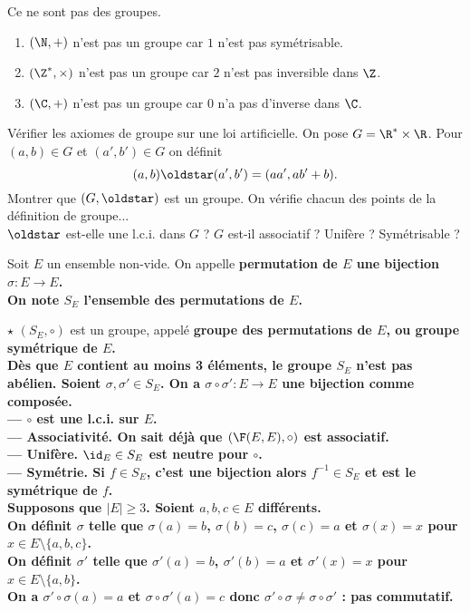 \documentclass[11pt]{article}
\begin{document}
\begin{ex}{Ce ne sont pas des groupes.}{}
    \begin{enumerate}
        \item $(\N,+)$ n'est pas un groupe car $1$ n'est pas symétrisable.
        \item $(\Z^*,\times)$ n'est pas un groupe car $2$ n'est pas inversible dans $\Z$.
        \item $(\C,+)$ n'est pas un groupe car $0$ n'a pas d'inverse dans $\C$.
    \end{enumerate}
\end{ex}

\begin{ex}{Vérifier les axiomes de groupe sur une loi artificielle.}{}
    On pose $G=\R^*\times\R$. Pour $(a,b)\in G$ et $(a',b')\in G$ on définit
    \begin{equation*}
        (a,b)\s(a',b')=(aa',ab'+b).
    \end{equation*}
    Montrer que $(G,\s)$ est un groupe.
    \tcblower
    On vérifie chacun des points de la définition de groupe...\\
    $\s$ est-elle une l.c.i. dans $G$ ? $G$ est-il associatif ? Unifère ? Symétrisable ? 
\end{ex}

\begin{defi}{}{}
    Soit $E$ un ensemble non-vide. On appelle \bf{permutation} de $E$ une bijection $\sigma:E\to E$.\\
    On note $S_E$ l'ensemble des permutations de $E$.
\end{defi}

\begin{prop}{$\star$}{}
    $(S_E,\circ)$ est un groupe, appelé \bf{groupe des permutations} de $E$, ou groupe symétrique de $E$.\\
    Dès que $E$ contient au moins 3 éléments, le groupe $S_E$ n'est pas abélien.
    \tcblower
    Soient $\sigma,\sigma'\in S_E$. On a $\sigma\circ\sigma':E\to E$ une bijection comme composée.\\
    --- $\circ$ est une l.c.i. sur $E$.\\
    --- \bf{Associativité.} On sait déjà que $(\F(E,E), \circ)$ est associatif.\\
    --- \bf{Unifère.} $\id_E\in S_E$ est neutre pour $\circ$.\\
    --- \bf{Symétrie.} Si $f\in S_E$, c'est une bijection alors $f^{-1}\in S_E$ et est le symétrique de $f$.\\
    Supposons que $|E|\geq3$. Soient $a,b,c\in E$ différents.\\
    On définit $\sigma$ telle que $\sigma(a)=b$, $\sigma(b)=c$, $\sigma(c)=a$ et $\sigma(x)=x$ pour $x\in E\setminus\{a,b,c\}$.\\
    On définit $\sigma'$ telle que $\sigma'(a)=b$, $\sigma'(b)=a$ et $\sigma'(x)=x$ pour $x\in E\setminus\{a,b\}$.\\
    On a $\sigma'\circ\sigma(a)=a$ et $\sigma\circ\sigma'(a)=c$ donc $\sigma'\circ\sigma\neq\sigma\circ\sigma'$ : pas commutatif.
\end{prop}
\end{document}
